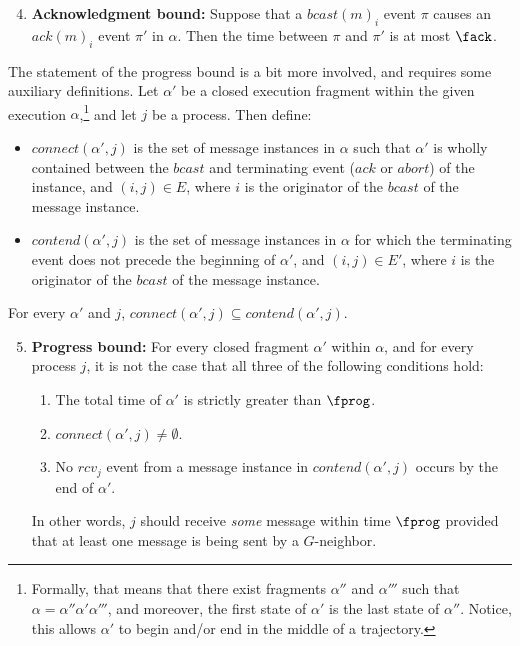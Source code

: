 \begin{enumerate}
\setcounter{enumi}{3}
\item
{\bf Acknowledgment bound:}
Suppose that a $bcast(m)_i$ event $\pi$ causes an $ack(m)_i$ event
$\pi'$ in $\alpha$.
Then the time between $\pi$ and $\pi'$ is at most $\fack$.
\end{enumerate}

The statement of the progress bound is a bit more involved, and
requires some auxiliary definitions.
Let $\alpha'$ be a closed execution fragment within the given execution
$\alpha$,\footnote{Formally, that means that there
  exist fragments $\alpha''$ and $\alpha'''$
  such that $\alpha = \alpha'' \alpha' \alpha'''$, and moreover, the first
  state of $\alpha'$ is the last state of $\alpha''$. Notice,
  this allows $\alpha'$ to begin and/or end in the middle of a trajectory.}
and let $j$ be a process.
Then define:
\begin{itemize}
\item
$connect(\alpha',j)$ is the set of message instances in $\alpha$ such that
$\alpha'$ is wholly contained between the $bcast$ and terminating
event ($ack$ or $abort$) of the instance, and $(i,j) \in E$, where $i$
is the originator of the $bcast$ of the message instance.
\item
$contend(\alpha',j)$ is the set of message instances in $\alpha$ for
which the terminating event does not precede the beginning of $\alpha'$, and
$(i,j) \in E'$, where $i$ is the originator of the $bcast$ of the
message instance.
\end{itemize}

\begin{lemma}
For every $\alpha'$ and $j$,
$connect(\alpha', j) \subseteq contend(\alpha',j)$.
\end{lemma}

\begin{enumerate}
\setcounter{enumi}{4}
\item
{\bf Progress bound:}
For every closed fragment $\alpha'$ within $\alpha$, and for every
process $j$, it is not the case that all three of the following
conditions hold:
  \begin{enumerate}
  \item The total time of $\alpha'$ is strictly greater than $\fprog$.
  \item $connect(\alpha', j) \neq \emptyset$.
  \item No $rcv_j$ event from a message instance in $contend(\alpha', j)$
    occurs by the end of $\alpha'$.
  \end{enumerate}
In other words, $j$ should receive {\em some} message within time
$\fprog$ provided that at least one message is being sent by a $G$-neighbor.
\end{enumerate}

